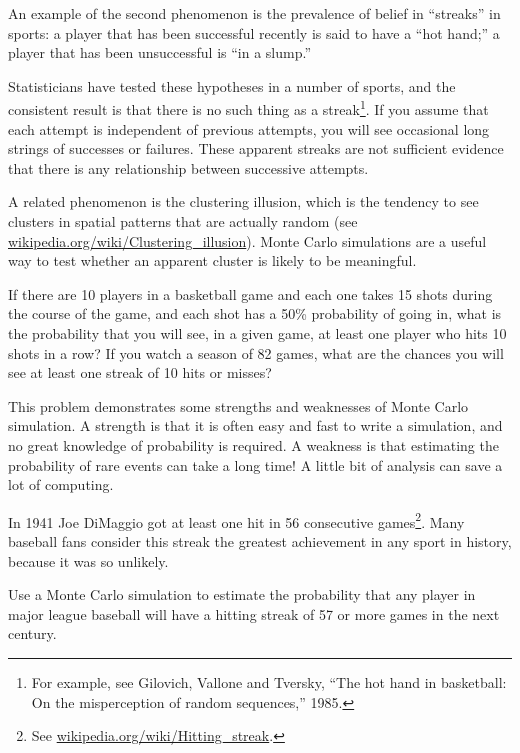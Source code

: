 \documentclass[12pt]{book}
\begin{document}
An example of the second phenomenon is the prevalence of belief
in ``streaks'' in sports: a player that has been successful recently
is said to have a ``hot hand;'' a player that has been unsuccessful is
``in a slump.''

Statisticians have tested these hypotheses in a number of sports, and
the consistent result is that there is no such thing as a
streak\footnote{For example, see Gilovich, Vallone and Tversky, ``The
  hot hand in basketball: On the misperception of random sequences,''
  1985.}.  If you assume that each attempt is independent of previous
attempts, you will see occasional long strings of successes or
failures.  These apparent streaks are not sufficient evidence that
there is any relationship between successive attempts.

A related phenomenon is the clustering illusion, which is the
tendency to see clusters in spatial patterns that are actually
random (see \url{wikipedia.org/wiki/Clustering_illusion}).
Monte Carlo simulations are a useful way to test whether an apparent
cluster is likely to be meaningful.

\begin{ex}

If there are 10 players in a basketball game and each one takes
15 shots during the course of the game, and each shot has a
50\% probability of going in, what is the probability that 
you will see, in a given game, at least one player who
hits 10 shots in a row?  If you watch a season of 82 games,
what are the chances you will see at least one streak of
10 hits or misses?

This problem demonstrates some strengths and weaknesses of Monte
Carlo simulation.  A strength is that it is often easy and fast
to write a simulation, and no great knowledge of probability is
required.  A weakness is that estimating the probability of
rare events can take a long time!  A little bit of analysis can
save a lot of computing.

\end{ex}


\begin{ex}

In 1941 Joe DiMaggio got at least one hit
in 56 consecutive games\footnote{See
  \url{wikipedia.org/wiki/Hitting_streak}.}.  Many baseball fans
consider this streak the greatest achievement in any sport in history,
because it was so unlikely.

Use a Monte Carlo simulation to estimate the probability that
any player in major league baseball will have a hitting streak
of 57 or more games in the next century.

\end{ex}
\end{document}
